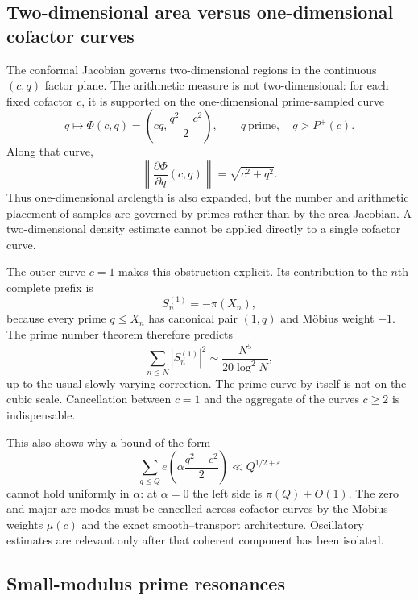 \documentclass[11pt]{article}
\theoremstyle{definition}
\theoremstyle{remark}
\newcommand{\eps}{\varepsilon}
\newcommand{\Pplus}{P^{+}}
\newcommand{\1}{\mathbf{1}}
\begin{document}
\subsection{Two-dimensional area versus one-dimensional cofactor curves}
\label{subsec:curve-versus-area}

The conformal Jacobian governs two-dimensional regions in the continuous
$(c,q)$ factor plane.  The arithmetic measure is not two-dimensional:
for each fixed cofactor $c$, it is supported on the one-dimensional
prime-sampled curve
\[
 q\longmapsto
 \Phi(c,q)
 =
 \left(cq,\frac{q^2-c^2}{2}\right),
 \qquad
 q\ \text{prime},\quad q>\Pplus(c).
\]
Along that curve,
\begin{equation}
 \left\lVert\frac{\partial\Phi}{\partial q}(c,q)\right\rVert
 =
 \sqrt{c^2+q^2}.
 \label{eq:curve-length-expansion}
\end{equation}
Thus one-dimensional arclength is also expanded, but the number and
arithmetic placement of samples are governed by primes rather than by
the area Jacobian.  A two-dimensional density estimate cannot be
applied directly to a single cofactor curve.

The outer curve $c=1$ makes this obstruction explicit.  Its contribution
to the $n$th complete prefix is
\begin{equation}
 S_n^{(1)}
 =
 -\pi(X_n),
 \label{eq:prime-curve-prefix}
\end{equation}
because every prime $q\le X_n$ has canonical pair $(1,q)$ and M\"obius
weight $-1$.  The prime number theorem therefore predicts
\begin{equation}
 \sum_{n\le N}|S_n^{(1)}|^2
 \sim
 \frac{N^5}{20\log^2 N},
 \label{eq:prime-curve-asymptotic}
\end{equation}
up to the usual slowly varying correction.  The prime curve by itself
is not on the cubic scale.  Cancellation between $c=1$ and the
aggregate of the curves $c\ge2$ is indispensable.

This also shows why a bound of the form
\[
 \sum_{q\le Q}e\!\left(\alpha\frac{q^2-c^2}{2}\right)
 \ll Q^{1/2+\eps}
\]
cannot hold uniformly in $\alpha$: at $\alpha=0$ the left side is
$\pi(Q)+O(1)$.  The zero and major-arc modes must be cancelled across
cofactor curves by the M\"obius weights $\mu(c)$ and the exact
smooth--transport architecture.  Oscillatory estimates are relevant
only after that coherent component has been isolated.


\subsection{Small-modulus prime resonances}
\label{subsec:exact-prime-resonances}
\end{document}
